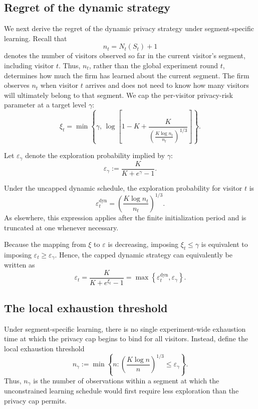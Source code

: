 \documentclass[mksc,nonblindrev]{informs3}
\begin{document}
\begin{APPENDICES}
\section{Regret of the dynamic strategy}
\label{web:regret_dynamic}
We next derive the regret of the dynamic privacy strategy under segment-specific learning. Recall that
\[
n_t
=
N_t(S_t)+1
\]
denotes the number of visitors observed so far in the current visitor's segment, including visitor \(t\). Thus, \(n_t\), rather than the global experiment round \(t\), determines how much the firm has learned about the current segment. The firm observes \(n_t\) when visitor \(t\) arrives and does not need to know how many visitors will ultimately belong to that segment. We cap the per-visitor privacy-risk parameter at a target level \(\gamma\):
\begin{equation}
\label{eq:dynamic-xi-cap}
\xi_t
=
\min\left\{
\gamma,\,
\log\left[
1-K+
\frac{K}{
\left(
\frac{K\log n_t}{n_t}
\right)^{1/3}
}
\right]
\right\}.
\end{equation}

Let \(\varepsilon_\gamma\) denote the exploration probability implied by
\(\gamma\):
\begin{equation}
\label{eq:epsilon-gamma}
\varepsilon_\gamma
:=
\frac{K}{K+e^\gamma-1}.
\end{equation}

Under the uncapped dynamic schedule, the exploration probability for visitor
\(t\) is
\begin{equation}
\label{eq:dynamic-exploration}
\varepsilon_t^{\mathrm{dyn}}
=
\left(
\frac{K\log n_t}{n_t}
\right)^{1/3}.
\end{equation}
As elsewhere, this expression applies after the finite initialization period and is truncated at one whenever necessary.

Because the mapping from \(\xi\) to \(\varepsilon\) is decreasing, imposing \(\xi_t\leq\gamma\) is equivalent to imposing \(\varepsilon_t\geq\varepsilon_\gamma\). Hence, the capped dynamic strategy can equivalently be written as
\begin{equation}
\label{eq:capped-dynamic-exploration}
\varepsilon_t
=
\frac{K}{K+e^{\xi_t}-1}
=
\max\left\{
\varepsilon_t^{\mathrm{dyn}},
\varepsilon_\gamma
\right\}.
\end{equation}

\subsection{The local exhaustion threshold}
Under segment-specific learning, there is no single experiment-wide exhaustion time at which the privacy cap begins to bind for all visitors. Instead, define the local exhaustion threshold
\begin{equation}
\label{eq:n-gamma-def}
n_\gamma
:=
\min\left\{
n:
\left(
\frac{K\log n}{n}
\right)^{1/3}
\leq
\varepsilon_\gamma
\right\}.
\end{equation}
Thus, \(n_\gamma\) is the number of observations within a segment at which the unconstrained learning schedule would first require less exploration than the privacy cap permits.


\end{APPENDICES}
\end{document}
